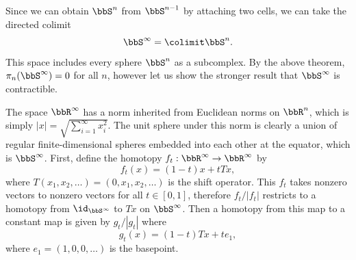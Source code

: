 \begin{example}[$\bbS^\infty$]\index{$\bbS^\infty$}\label{S-infty}
    Since we can obtain $\bbS^n$ from $\bbS^{n-1}$ by attaching two cells, we can take the directed colimit
    \[\bbS^\infty=\colimit \bbS^n.\]
    This space includes every sphere $\bbS^n$ as a subcomplex. By the above theorem, $\pi_n(\bbS^\infty)=0$ for all $n$, however let us show the stronger result that $\bbS^\infty$ is contractible.

    The space $\bbR^\infty$ has a norm inherited from Euclidean norms on $\bbR^n$, which is simply $|x|=\sqrt{\sum_{i=1}^\infty x_i^2}$. The unit sphere under this norm is clearly a union of regular finite-dimensional spheres embedded into each other at the equator, which is $\bbS^\infty$. First, define the homotopy $f_t:\bbR^\infty\to \bbR^\infty$ by 
    \[f_t(x)=(1-t)x+tTx,\label{eq contracting homotopy S-inf}\]
    where $T(x_1,x_2,\ldots)=(0,x_1,x_2,\ldots)$ is the shift operator. This $f_t$ takes nonzero vectors to nonzero vectors for all $t\in[0,1]$, therefore $f_t/|f_t|$ restricts to a homotopy from $\id_{\bbS^\infty}$ to $Tx$ on $\bbS^\infty$. Then a homotopy from this map to a constant map is given by $g_t/|g_t|$ where
    \[g_t(x)=(1-t)Tx+te_1,\]
    where $e_1=(1,0,0,\ldots)$ is the basepoint.
\end{example}



